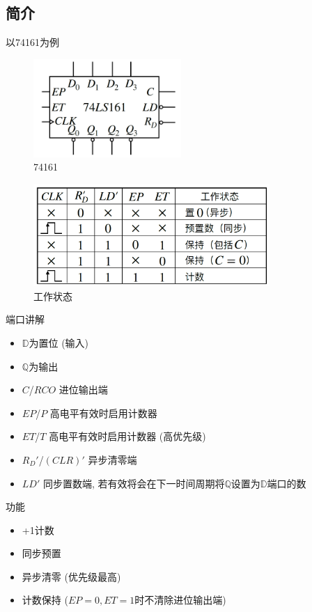 \documentclass[scheme=chinese,a4paper]{report}
\begin{document}
\subsection{简介}
以74161为例
\begin{figure}[H]
\centering
\includegraphics[width=0.5\textwidth]{ic_counter.png}
\caption{74161}
\end{figure}
\begin{figure}[H]
\centering
\includegraphics[width=0.8\textwidth]{ic_counter_table.png}
\caption{工作状态}
\end{figure}
端口讲解
\begin{itemize}
    \item $\mathbb{D}$为置位 (输入)
    \item $\mathbb{Q}$为输出
    \item $C$/$RCO$ 进位输出端
    \item $EP$/$P$ 高电平有效时启用计数器
    \item $ET$/$T$ 高电平有效时启用计数器 (高优先级)
    \item $R_D'$/$(CLR)'$ 异步清零端
    \item $LD'$ 同步置数端, 若有效将会在下一时间周期将$\mathbb{Q}$设置为$\mathbb{D}$端口的数
\end{itemize}
功能
\begin{itemize}
    \item +1计数
    \item 同步预置
    \item 异步清零 (优先级最高)
    \item 计数保持 ($EP=0,ET=1$时不清除进位输出端)
\end{itemize}
\end{document}
